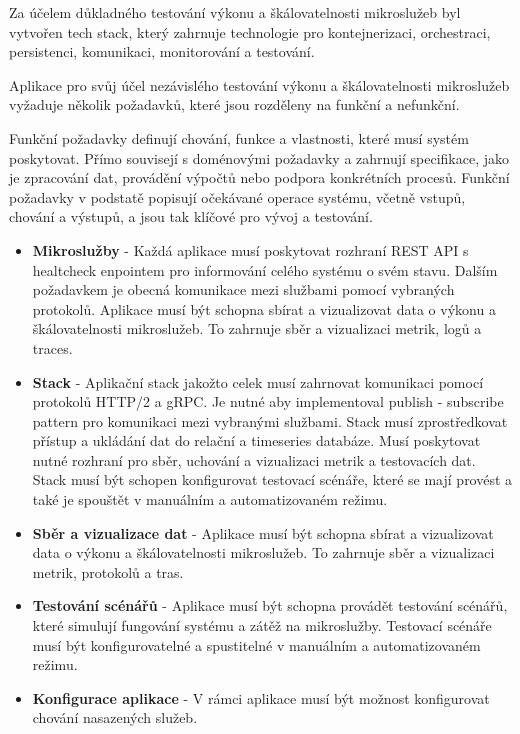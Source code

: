 

Za účelem důkladného testování výkonu a škálovatelnosti mikroslužeb byl vytvořen tech stack, který zahrnuje technologie pro kontejnerizaci, orchestraci, persistenci, komunikaci, monitorování a testování. 


Aplikace pro svůj účel nezávislého testování výkonu a škálovatelnosti mikroslužeb vyžaduje několik požadavků, které jsou rozděleny na funkční a nefunkční.


Funkční požadavky definují chování, funkce a vlastnosti, které musí systém poskytovat. Přímo souvisejí s doménovými požadavky a zahrnují specifikace, jako je zpracování dat, provádění výpočtů nebo podpora konkrétních procesů. Funkční požadavky v podstatě popisují očekávané operace systému, včetně vstupů, chování a výstupů, a jsou tak klíčové pro vývoj a testování.

\begin{itemize}
  \item \textbf{Mikroslužby} - Každá aplikace musí poskytovat rozhraní REST API s healtcheck enpointem pro informování celého systému o svém stavu. Dalším požadavkem je obecná komunikace mezi službami pomocí vybraných protokolů. Aplikace musí být schopna sbírat a vizualizovat data o výkonu a škálovatelnosti mikroslužeb. To zahrnuje sběr a vizualizaci metrik, logů a traces.
  \item \textbf{Stack} - Aplikační stack jakožto celek musí zahrnovat komunikaci pomocí protokolů HTTP/2 a gRPC. Je nutné aby implementoval publish - subscribe pattern pro komunikaci mezi vybranými službami. Stack musí zprostředkovat přístup a ukládání dat do relační a timeseries databáze. Musí poskytovat nutné rozhraní pro sběr, uchování a vizualizaci metrik a testovacích dat. Stack musí být schopen konfigurovat testovací scénáře, které se mají provést a také je spouštět v manuálním a automatizovaném režimu.
  \item \textbf{Sběr a vizualizace dat} - Aplikace musí být schopna sbírat a vizualizovat data o výkonu a škálovatelnosti mikroslužeb. To zahrnuje sběr a vizualizaci metrik, protokolů a tras.
  \item \textbf{Testování scénářů} - Aplikace musí být schopna provádět testování scénářů, které simulují fungování systému a zátěž na mikroslužby. Testovací scénáře musí být konfigurovatelné a spustitelné v manuálním a automatizovaném režimu. 
  \item \textbf{Konfigurace aplikace} - V rámci aplikace musí být možnost konfigurovat chování nasazených služeb.
\end{itemize}

